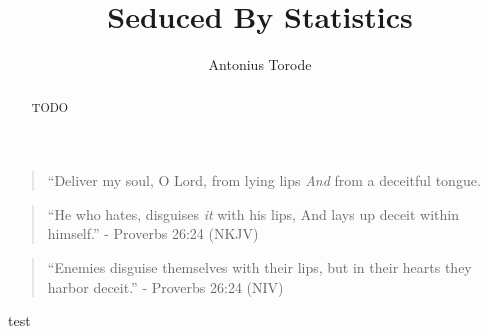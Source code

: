 \documentclass[10pt]{article}
\title{Seduced By Statistics}
\author{Antonius Torode}
\begin{document}
\maketitle
\thispagestyle{fancy}


\begin{abstract}
TODO
\end{abstract}

\begin{multicols}{2}


\begin{quotation}
``Deliver my soul, O Lord, from lying lips \textit{And} from a deceitful tongue.
\end{quotation}


\begin{quotation}
``He who hates, disguises \textit{it} with his lips, And lays up deceit within himself.'' - Proverbs 26:24 (NKJV)
\end{quotation}
\begin{quotation}
``Enemies disguise themselves with their lips, but in their hearts they harbor deceit.'' - Proverbs 26:24 (NIV)
\end{quotation}



\begin{thebibliography}{9}
	{\footnotesize
		
	 test
	
	}
\end{thebibliography}

\end{multicols}


\end{document}
